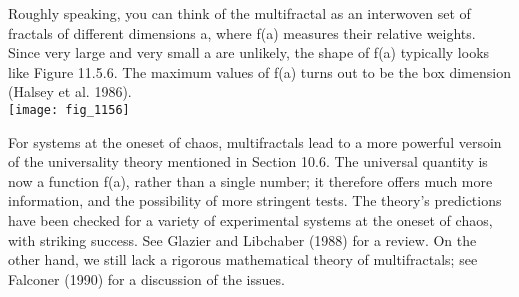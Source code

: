 \documentclass{article}
\newcommand\tab[1][1cm]{\hspace*{#1}}
\begin{document}
Roughly speaking, you can think of the multifractal as an interwoven set of fractals of different dimensions a, where f(a) measures their relative weights. Since very large and very small a are unlikely, the shape of f(a) typically looks like Figure 11.5.6. The maximum values of f(a) turns out to be the box dimension (Halsey et al. 1986). \\

\texttt{[image: fig\_1156]}

\tab For systems at the oneset of chaos, multifractals lead to a more powerful versoin of the universality theory mentioned in Section 10.6. The universal quantity is now a function f(a), rather than a single number; it therefore offers much more information, and the possibility of more stringent tests. The theory's predictions have been checked for a variety of experimental systems at the oneset of chaos, with striking success. See Glazier and Libchaber (1988) for a review. On the other hand, we still lack a rigorous mathematical theory of multifractals; see Falconer (1990) for a discussion of the issues.
\end{document}
